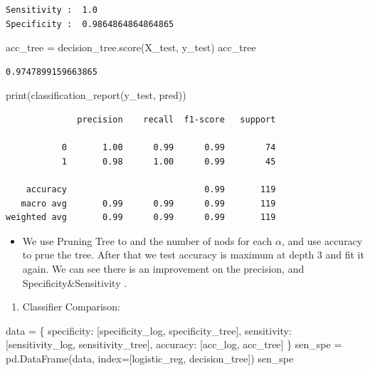 \documentclass[
  11pt,
  letterpaper,
  DIV=11,
  numbers=noendperiod]{scrartcl}
\newenvironment{Shaded}{\begin{snugshade}}{\end{snugshade}}
\newcommand{\BuiltInTok}[1]{\textcolor[rgb]{0.00,0.23,0.31}{#1}}
\newcommand{\NormalTok}[1]{\textcolor[rgb]{0.00,0.23,0.31}{#1}}
\newcommand{\OperatorTok}[1]{\textcolor[rgb]{0.37,0.37,0.37}{#1}}
\newcommand{\StringTok}[1]{\textcolor[rgb]{0.13,0.47,0.30}{#1}}
\providecommand{\tightlist}{%
  \setlength{\itemsep}{0pt}\setlength{\parskip}{0pt}}\usepackage{longtable,booktabs,array}
\begin{document}
\begin{verbatim}
Sensitivity :  1.0
Specificity :  0.9864864864864865
\end{verbatim}

\begin{Shaded}
\begin{Highlighting}[]
\NormalTok{acc\_tree }\OperatorTok{=}\NormalTok{ decision\_tree.score(X\_test, y\_test)}
\NormalTok{acc\_tree}
\end{Highlighting}
\end{Shaded}

\begin{verbatim}
0.9747899159663865
\end{verbatim}

\begin{Shaded}
\begin{Highlighting}[]
\BuiltInTok{print}\NormalTok{(classification\_report(y\_test, pred))}
\end{Highlighting}
\end{Shaded}

\begin{verbatim}
              precision    recall  f1-score   support

           0       1.00      0.99      0.99        74
           1       0.98      1.00      0.99        45

    accuracy                           0.99       119
   macro avg       0.99      0.99      0.99       119
weighted avg       0.99      0.99      0.99       119
\end{verbatim}

\begin{itemize}
\tightlist
\item
  We use Pruning Tree to and the number of nods for each \(\alpha\), and
  use accuracy to prue the tree. After that we test accuracy is maximum
  at depth 3 and fit it again. We can see there is an improvement on the
  precision, and Specificity\&Sensitivity .
\end{itemize}

\begin{enumerate}
\def\labelenumi{\arabic{enumi}.}
\setcounter{enumi}{11}
\tightlist
\item
  Classifier Comparison:
\end{enumerate}

\begin{Shaded}
\begin{Highlighting}[]
\NormalTok{data }\OperatorTok{=}\NormalTok{ \{}
    \StringTok{\textquotesingle{}specificity\textquotesingle{}}\NormalTok{: [specificity\_log, specificity\_tree],}
    \StringTok{\textquotesingle{}sensitivity\textquotesingle{}}\NormalTok{: [sensitivity\_log, sensitivity\_tree],}
    \StringTok{\textquotesingle{}accuracy\textquotesingle{}}\NormalTok{: [acc\_log, acc\_tree]}
\NormalTok{\}}
\NormalTok{sen\_spe }\OperatorTok{=}\NormalTok{ pd.DataFrame(data, index}\OperatorTok{=}\NormalTok{[}\StringTok{\textquotesingle{}logistic\_reg\textquotesingle{}}\NormalTok{, }\StringTok{\textquotesingle{}decision\_tree\textquotesingle{}}\NormalTok{])}
\NormalTok{sen\_spe}
\end{Highlighting}
\end{Shaded}
\end{document}
